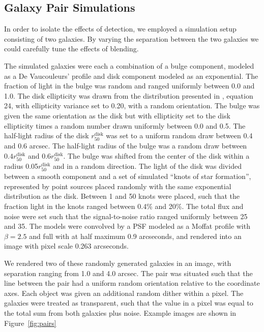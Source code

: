 \documentclass[iop, twocolappendix, appendixfloats, numberedappendix, apj]{hackemulateapj}
\begin{document}
\subsection{Galaxy Pair Simulations}
\label{sec:sims:pairs}

In order to isolate the effects of detection, we employed a simulation setup
consisting of two galaxies.   By varying the separation between the two
galaxies we could carefully tune the effects of blending.

The simulated galaxies were each a combination of a bulge component, modeled as
a De Vaucouleurs' profile \citep{devauc1948} and disk component modeled as an
exponential. The fraction of light in the bulge was random and ranged uniformly
between 0.0 and 1.0. The disk ellipticity was drawn from the distribution
presented in \cite{ba14}, equation 24, with ellipticity variance set to 0.20,
with a random orientation. The bulge was given the same orientation as the disk
but with ellipticity set to the disk ellipticity times a random number drawn
uniformly between 0.0 and 0.5. The half-light radius of the disk
$r_{50}^{\mathrm{disk}}$ was set to a uniform random draw between 0.4 and 0.6
arcsec. The half-light radius of the bulge was a random draw between $0.4
r_{50}^{\mathrm{disk}}$ and $0.6 r_{50}^{\mathrm{disk}}$. The bulge was shifted
from the center of the disk within a radius 0.05$r_{50}^{\mathrm{disk}}$ and in
a random direction. The light of the disk was divided between a smooth
component and a set of simulated ``knots of star formation'', represented by
point sources placed randomly with the same exponential distribution as the
disk.  Between 1 and 50 knots were placed, such that the fraction light in the
knots ranged between 0.4\% and 20\%. The total flux and noise were set such
that the signal-to-noise ratio ranged uniformly between 25 and 35.  The models
were convolved by a PSF modeled as a Moffat \citep{Moffat1969} profile with
$\beta=2.5$ and full with at half maximum 0.9 arcseconds, and rendered into an
image with pixel scale 0.263 arcseconds.

We rendered two of these randomly generated galaxies in an image, with
separation ranging from 1.0 and 4.0 arcsec. The pair was situated such that the
line between the pair had a uniform random orientation relative to the
coordinate axes. Each object was given an additional random dither within a
pixel. The galaxies were treated as transparent, such that the value in a pixel
was equal to the total sum from both galaxies plus noise. Example images are
shown in Figure~\ref{fig:pairs}
\end{document}
